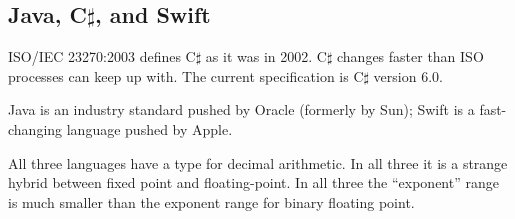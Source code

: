 \documentclass{article}
\begin{document}
\subsection{Java, C$\sharp$, and Swift}

ISO/IEC 23270:2003 defines C$\sharp$ as it was in 2002.
C$\sharp$ changes faster than ISO processes can keep up with.
The current specification is C$\sharp$ version 6.0.

Java is an industry standard pushed by Oracle (formerly by Sun);
Swift is a fast-changing language pushed by Apple.

All three languages have a type for decimal arithmetic.
In all three it is a strange hybrid between fixed point
and floating-point.  In all three the ``exponent'' range is
much smaller than the exponent range for binary floating point.
\end{document}
